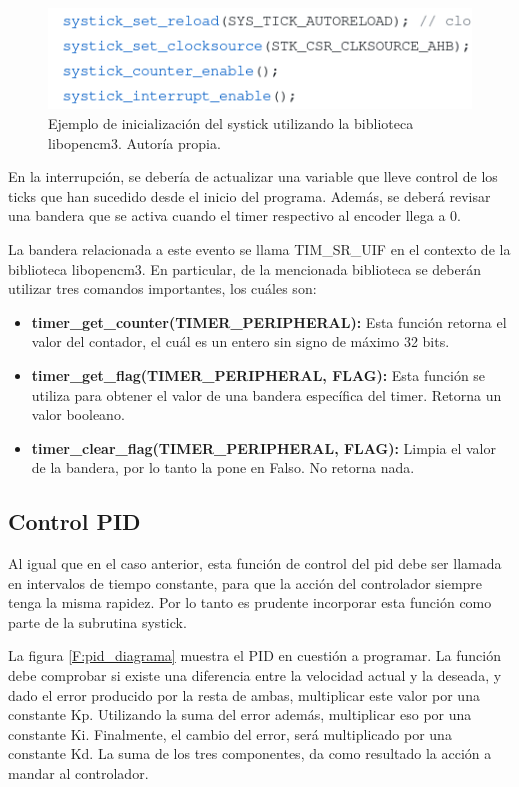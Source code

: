 \begin{figure}[H]
\centering
\includegraphics[scale=0.5]{imagenes/systick.png}
\caption{Ejemplo de inicialización del systick utilizando la biblioteca libopencm3. Autoría propia.}
\label{F:systick}
\end{figure}

En la interrupción, se debería de actualizar una variable que lleve control de los ticks que han sucedido desde el inicio del programa. Además, se deberá revisar una bandera que se activa cuando el timer respectivo al encoder llega a 0.

La bandera relacionada a este evento se llama TIM\_SR\_UIF en el contexto de la biblioteca libopencm3. En particular, de la mencionada biblioteca se deberán utilizar tres comandos importantes, los cuáles son:

\begin{itemize}
\item \textbf{timer\_get\_counter(TIMER\_PERIPHERAL):} Esta función retorna el valor del contador, el cuál es un entero sin signo de máximo 32 bits.

\item \textbf{timer\_get\_flag(TIMER\_PERIPHERAL, FLAG):} Esta función se utiliza para obtener el valor de una bandera específica del timer. Retorna un valor booleano.

\item \textbf{timer\_clear\_flag(TIMER\_PERIPHERAL, FLAG):} Limpia el valor de la bandera, por lo tanto la pone en Falso. No retorna nada.
\end{itemize}

\subsection{Control PID}

Al igual que en el caso anterior, esta función de control del pid debe ser llamada en intervalos de tiempo constante, para que la acción del controlador siempre tenga la misma rapidez. Por lo tanto es prudente incorporar esta función como parte de la subrutina systick.

La figura \ref{F:pid_diagrama} muestra el PID en cuestión a programar. La función debe comprobar si existe una diferencia entre la velocidad actual y la deseada, y dado el error producido por la resta de ambas, multiplicar este valor por una constante Kp. Utilizando la suma del error además, multiplicar eso por una constante Ki. Finalmente, el cambio del error, será multiplicado por una constante Kd. La suma de los tres componentes, da como resultado la acción a mandar al controlador.

